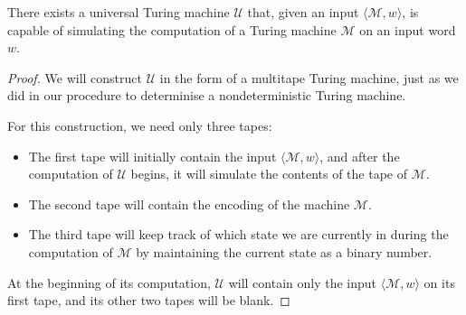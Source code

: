 \begin{theorem}
There exists a universal Turing machine $\mathcal{U}$ that, given an input $\langle \mathcal{M}, w \rangle$, is capable of simulating the computation of a Turing machine $\mathcal{M}$ on an input word $w$.

\begin{proof}
We will construct $\mathcal{U}$ in the form of a multitape Turing machine, just as we did in our procedure to determinise a nondeterministic Turing machine.

For this construction, we need only three tapes:
\begin{itemize}
\item The first tape will initially contain the input $\langle \mathcal{M}, w \rangle$, and after the computation of $\mathcal{U}$ begins, it will simulate the contents of the tape of $\mathcal{M}$.
\item The second tape will contain the encoding of the machine $\mathcal{M}$.
\item The third tape will keep track of which state we are currently in during the computation of $\mathcal{M}$ by maintaining the current state as a binary number.
\end{itemize}

At the beginning of its computation, $\mathcal{U}$ will contain only the input $\langle \mathcal{M}, w \rangle$ on its first tape, and its other two tapes will be blank.


\end{proof}
\end{theorem}
